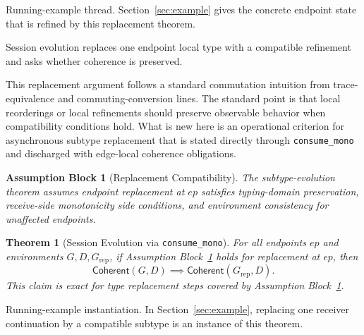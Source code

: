 \documentclass[a4paper,10pt,twocolumn,english]{article}
\numberwithin{equation}{section}
\theoremstyle{paperdef}
\theoremstyle{paperplain}
\newtheorem{theorem}[definition]{Theorem}
\theoremstyle{paperdef}
\newtheorem{assumption}{Assumption Block}[section]
\theoremstyle{paperremark}
\newcommand{\Coherent}{\ensuremath{\mathsf{Coherent}}}
\begin{document}
Running-example thread. Section~\ref{sec:example} gives the concrete endpoint
state that is refined by this replacement theorem.

Session evolution replaces one endpoint local type with a compatible refinement and asks whether coherence is preserved.

This replacement argument follows a standard commutation intuition from trace-equivalence and commuting-conversion lines. The standard point is that local reorderings or local refinements should preserve observable behavior when compatibility conditions hold. What is new here is an operational criterion for asynchronous subtype replacement that is stated directly through \nolinkurl{consume_mono} and discharged with edge-local coherence obligations.

\begin{assumption}[Replacement Compatibility]
	\label{assump:p1-replacement}
	The subtype-evolution theorem assumes endpoint replacement at $ep$ satisfies typing-domain preservation, receive-side monotonicity side conditions, and environment consistency for unaffected endpoints.
\end{assumption}

\begin{theorem}[Session Evolution via \nolinkurl{consume_mono}]
	\label{thm:session-evolution}
	For all endpoints $ep$ and environments $G,D,G_{\mathrm{rep}}$, if Assumption Block~\ref{assump:p1-replacement} holds for replacement at $ep$, then
	\begin{equation}
		\Coherent(G,D) \implies \Coherent(G_{\mathrm{rep}},D).
	\end{equation}
	This claim is exact for type replacement steps covered by Assumption Block~\ref{assump:p1-replacement}.
\end{theorem}

Running-example instantiation. In Section~\ref{sec:example}, replacing one
receiver continuation by a compatible subtype is an instance of this theorem.
\end{document}
